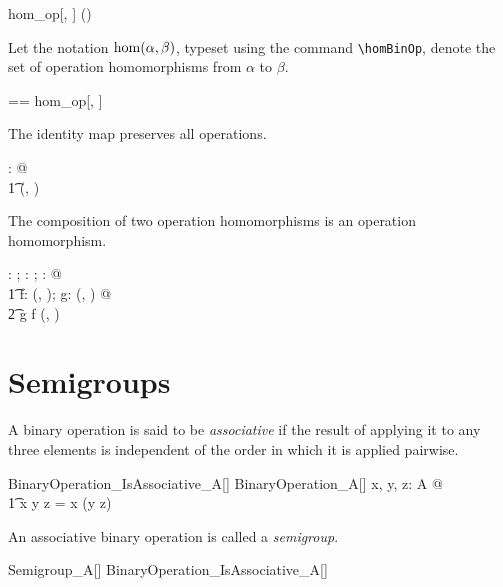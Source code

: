 \documentclass{amsart}
\begin{document}
\begin{remark}
\begin{zed}
	hom\_op[\setT, \setU] \in \binop \setT \cross \binop \setU \fun \power (\setT \pfun \setU)
\end{zed}
\end{remark}

Let the notation $\operatorname{hom}(\alpha, \beta)$,  typeset using the command \verb|\homBinOp|, 
denote the set of operation homomorphisms from $\alpha$ to $\beta$.

\begin{zed}
	\homBinOp[\genT, \genU] == hom\_op[\genT, \genU]
\end{zed}

\begin{remark}
The identity map preserves all operations.
\begin{zed}
	\forall \strucA: \binop \setX @ \\
	\t1	\id \setX \in \homBinOp(\strucA, \strucA)
\end{zed}
\end{remark}

\begin{remark}
The composition of two operation homomorphisms is an operation homomorphism.
\begin{zed}
	\forall \strucA: \binop \setX; \strucB: \binop \setY; \strucC: \binop \setZ @ \\
	\t1	\forall f: \homBinOp(\strucA, \strucB); g: \homBinOp(\strucB, \strucC) @ \\
	\t2		g \circ f \in \homBinOp(\strucA, \strucC)
\end{zed}
\end{remark}

\section{Semigroups}

A binary operation is said to be \textit{associative} if the result of applying it to any three elements
is independent of the order in which it is applied pairwise.

\begin{schema}{BinaryOperation\_IsAssociative\_A}[\genT]
	BinaryOperation\_A[\genT]
\where
	\forall x, y, z: A @ \\
	\t1	x \mulA y \mulA z = x \mulA (y \mulA z)
\end{schema}

An associative binary operation is called a \textit{semigroup}.
\begin{zed}
	Semigroup\_A[\genT]  BinaryOperation\_IsAssociative\_A[\genT]
\end{zed}
\end{document}
